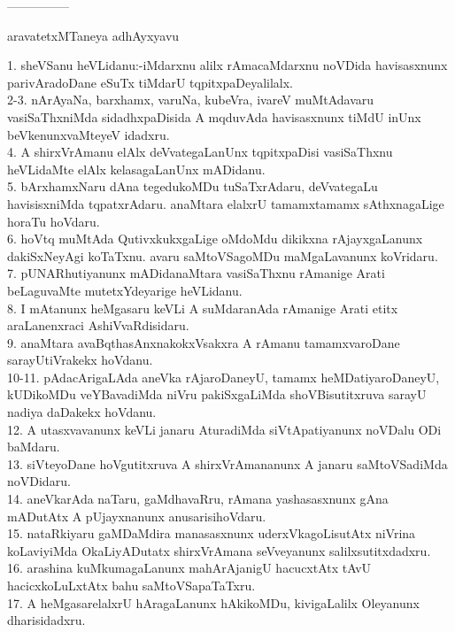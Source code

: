 \documentclass{article}
\begin{document}
\begin{center}
---------------
\end{center}

\begin{center}
aravatetxMTaneya adhAyxyavu
\end{center}

1. sheVSanu heVLidanu:-iMdarxnu alilx rAmacaMdarxnu noVDida havisasxnunx parivAradoDane eSuTx tiMdarU tqpitxpaDeyalilalx.\\
2-3. nArAyaNa, barxhamx, varuNa, kubeVra, ivareV muMtAdavaru vasiSaThxniMda sidadhxpaDisida A mqduvAda havisasxnunx tiMdU inUnx beVkenunxvaMteyeV idadxru.\\
4. A shirxVrAmanu elAlx deVvategaLanUnx tqpitxpaDisi vasiSaThxnu heVLidaMte elAlx kelasagaLanUnx mADidanu.\\
5. bArxhamxNaru dAna tegedukoMDu tuSaTxrAdaru, deVvategaLu havisisxniMda tqpatxrAdaru. anaMtara elalxrU tamamxtamamx sAthxnagaLige horaTu hoVdaru.\\
6. hoVtq muMtAda QutivxkukxgaLige oMdoMdu dikikxna rAjayxgaLanunx dakiSxNeyAgi koTaTxnu. avaru saMtoVSagoMDu maMgaLavanunx koVridaru.\\
7. pUNARhutiyanunx mADidanaMtara vasiSaThxnu rAmanige Arati beLaguvaMte mutetxYdeyarige heVLidanu.\\
8. I mAtanunx heMgasaru keVLi A suMdaranAda rAmanige Arati etitx araLanenxraci AshiVvaRdisidaru.\\
9. anaMtara avaBqthasAnxnakokxVsakxra A rAmanu tamamxvaroDane sarayUtiVrakekx hoVdanu.\\
10-11. pAdacArigaLAda aneVka rAjaroDaneyU, tamamx heMDatiyaroDaneyU, kUDikoMDu veYBavadiMda niVru pakiSxgaLiMda shoVBisutitxruva sarayU nadiya daDakekx hoVdanu.\\
12. A utasxvavanunx keVLi janaru AturadiMda siVtApatiyanunx noVDalu ODi baMdaru.\\
13. siVteyoDane hoVgutitxruva A shirxVrAmananunx A janaru saMtoVSadiMda noVDidaru.\\
14. aneVkarAda naTaru, gaMdhavaRru, rAmana yashasasxnunx gAna mADutAtx A pUjayxnanunx anusarisihoVdaru.\\
15. nataRkiyaru gaMDaMdira manasasxnunx uderxVkagoLisutAtx niVrina koLaviyiMda OkaLiyADutatx shirxVrAmana seVveyanunx salilxsutitxdadxru.\\
16. arashina kuMkumagaLanunx mahArAjanigU hacucxtAtx tAvU hacicxkoLuLxtAtx bahu saMtoVSapaTaTxru.\\
17. A heMgasarelalxrU hAragaLanunx hAkikoMDu, kivigaLalilx Oleyanunx dharisidadxru.\\
\end{document}
